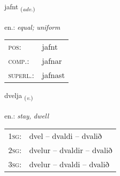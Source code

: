 \documentclass[frontgrid, backgrid]{flacards}\usepackage[]{graphicx}\usepackage[]{xcolor}
\begin{document}
\renewcommand{\flhead}{\vskip5pt \fboxsep=0pt {\small\bfseries\footnotesize Atviksorð | Adverb}}
\renewcommand{\fcfoot}{\vskip5pt \fboxsep=0pt \hspace{2pt}{\small\bfseries\footnotesize 2K}}

\renewcommand{\blhead}{\vskip5pt {\small\bfseries\footnotesize Atviksorð | Adverb }}
\renewcommand{\bcfoot}{\vskip5pt \hspace{2pt}{\small\bfseries\footnotesize 2K}}


{jafnt \small{\textsubscript{(\textit{adv.})}} \\[1ex] %
\textphonetic{[jam̥t]} \\
en.: \emph{equal; uniform} \\  [2ex]
\renewcommand*{\arraystretch}{0.8}
\begin{tabular}{ll}
\textsc{pos}: & jafnt \\ 
\textsc{comp.}: & jafnar \\ 
\textsc{superl.}: & jafnast \\
\end{tabular}
}

\renewcommand{\flhead}{\vskip5pt \fboxsep=0pt {\small\bfseries\footnotesize Sagnorð | Verb}}
\renewcommand{\fcfoot}{\vskip5pt \fboxsep=0pt \hspace{2pt}{\small\bfseries\footnotesize 2K}}

\renewcommand{\blhead}{\vskip5pt {\small\bfseries\footnotesize Sagnorð | Verb }}
\renewcommand{\bcfoot}{\vskip5pt \hspace{2pt}{\small\bfseries\footnotesize 2K}}


{dvelja \small{\textsubscript{(\textit{v.})}} \\[1ex] %
\textphonetic{[tvɛlja]} \\
en.: \emph{stay, dwell} \\  [2ex]
\renewcommand*{\arraystretch}{0.8}
\begin{tabular}{p{1cm}l}
\textsc{1sg}: & dvel -- dvaldi -- dvalið \\ 
\textsc{2sg}: & dvelur -- dvaldir -- dvalið \\ 
\textsc{3sg}: & dvelur -- dvaldi -- dvalið \\ 
\end{tabular}
}
\end{document}
